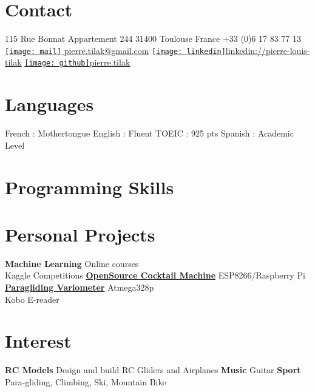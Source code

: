 \documentclass[a4paper]{friggeri-cv} %
\begin{document}


\begin{aside} %
\section{Contact}
115 Rue Bonnat
Appartement 244
31400 Toulouse
France
+33 (0)6 17 83 77 13
~
\href{mailto:pierre.tilak@gmail.com}{\texttt{[image: mail]} pierre.tilak@gmail.com}
\href{https://www.linkedin.com/pub/pierre-louis-tilak/96/162/a83}{\texttt{[image: linkedin]}linkedin://pierre-louis-tilak}
\href{http://tilaktilak.github.io}{\texttt{[image: github]}pierre.tilak}
\section{Languages}
French : Mothertongue
English : Fluent
TOEIC : 925 pts 
Spanish : Academic Level\bigskip\bigskip
\section{Programming Skills}
\bigskip\bigskip
\section{Personal Projects}
\textbf{Machine Learning}
Online courses\\Kaggle Competitions
\href{https://github.com/tilaktilak/Inebriator}{\textbf{OpenSource Cocktail Machine}}
ESP8266/Raspberry Pi\bigskip
\href{https://github.com/tilaktilak/xcvario}{\textbf{Paragliding Variometer}}
Atmega328p\\ Kobo E-reader\bigskip\bigskip
\section{Interest}
\textbf{RC Models} Design and build RC Gliders and Airplanes
\textbf{Music} Guitar
\textbf{Sport} Para-gliding, Climbing, Ski, Mountain Bike
\end{aside}
\end{document}
